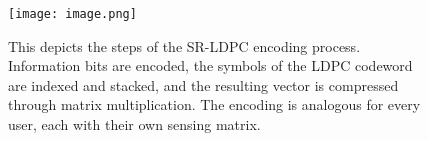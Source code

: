 \begin{figure}[h]
    \centering
    \texttt{[image: image.png]}
    \caption{This depicts the steps of the SR-LDPC encoding process. Information bits are encoded, the symbols of the LDPC codeword are indexed and stacked, and the resulting vector is compressed through matrix multiplication. The encoding is analogous for every user, each with their own sensing matrix.}
    \label{fig:sr-ldpc_encoding}
\end{figure}